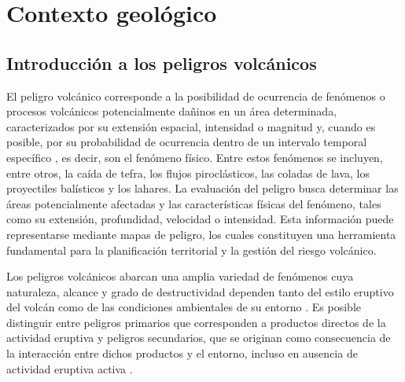 \chapter{Contexto geológico}%
\label{cap:capitulo2}%

\section{Introducción a los peligros volcánicos}

El peligro volcánico corresponde a la posibilidad de ocurrencia de fenómenos o procesos volcánicos potencialmente dañinos en un área determinada, caracterizados por su extensión espacial, intensidad o magnitud y, cuando es posible, 
por su probabilidad de ocurrencia dentro de un intervalo temporal específico \cite{ortiz1995danos}, es decir, son el fenómeno físico. Entre estos fenómenos se incluyen, entre otros, la caída de tefra, los flujos piroclásticos, las coladas de lava, 
los proyectiles balísticos y los lahares. La evaluación del peligro busca determinar las áreas potencialmente afectadas y las características físicas del fenómeno, tales como su extensión, profundidad, velocidad o intensidad. 
Esta información puede representarse mediante mapas de peligro, los cuales constituyen una herramienta fundamental para la planificación territorial y la gestión del riesgo volcánico.

Los peligros volcánicos abarcan una amplia variedad de fenómenos cuya naturaleza, alcance y grado de destructividad dependen tanto del estilo eruptivo del volcán como de las condiciones ambientales de su entorno \cite{blong1984volcanic}. 
Es posible distinguir entre peligros primarios que corresponden a productos directos de la actividad eruptiva y peligros secundarios, que se originan como consecuencia de la interacción entre dichos productos y el entorno, 
incluso en ausencia de actividad eruptiva activa \cite{sigurdsson2015encyclopedia}.


